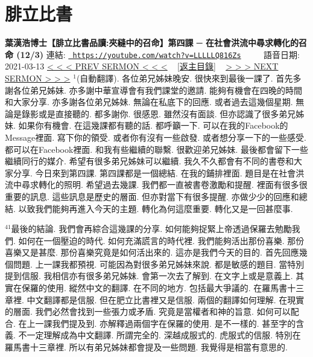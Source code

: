 \documentclass{book}
\begin{document}
\section{腓立比書}
\label{sec:LLLLLQ816Zs}
\textbf{葉漢浩博士【腓立比書品讀:夾縫中的召命】第四課 ─ 在社會洪流中尋求轉化的召命 (12/3)}
\newline
\newline
連結: \href{https://youtube.com/watch?v=LLLLLQ816Zs}{\texttt{ https://youtube.com/watch?v=LLLLLQ816Zs}} ~~~~ 語音日期: 2021-03-13 
\newline
\newline
\hyperref[sec:mVawzgk9_PE]{\small{< < < PREV SERMON < < <}}
~
\hyperref[sec:index]{\small{[返主目錄]}}
~
\hyperref[sec:SEh8cg_SNkc]{\small{> > > NEXT SERMON > > >}}
\newline
\newline
$^{1}$(自動翻譯).
各位弟兄姊妹晚安.
很快來到最後一課了.
首先多謝各位弟兄姊妹.
亦多謝中華宣導會有我們課堂的邀請.
能夠有機會在四晚的時間和大家分享.
亦多謝各位弟兄姊妹.
無論在私底下的回應.
或者過去這幾個星期.
無論是錄影或是直接聽的.
都多謝你.
很感恩.
雖然沒有面談.
但亦認識了很多弟兄姊妹.
如果你有機會.
在這幾課都有聽的話.
都呼籲一下.
可以在我的Facebook的Message裡面.
寫下你的領受.
或者你有沒有一些啟發.
或者想分享一下的一些感受.
都可以在Facebook裡面.
和我有些繼續的聯繫.
很歡迎弟兄姊妹.
最後都會留下一些繼續同行的媒介.
希望有很多弟兄姊妹可以繼續.
我久不久都會有不同的書卷和大家分享.
今日來到第四課.
第四課都是一個總結.
在我的鋪排裡面.
題目是在社會洪流中尋求轉化的照明.
希望過去幾課.
我們都一直被書卷激勵和提醒.
裡面有很多很重要的訊息.
這些訊息是歷史的層面.
但亦對當下有很多提醒.
亦做少少的回應和總結.
以致我們能夠再進入今天的主題.
轉化為何這麼重要.
轉化又是一回甚麼事.

$^{41}$最後的結論.
我們會再綜合這幾課的分享.
如何能夠捉緊上帝透過保羅去勉勵我們.
如何在一個壓迫的時代.
如何充滿謊言的時代裡.
我們能夠活出那份喜樂.
那份喜樂又是甚麼.
那份喜樂究竟是如何活出來的.
這亦是我們今天的目的.
首先回應幾個問題.
上一課我都預視.
可能因為對很多弟兄姊妹來說.
都是敏感的題目.
當特別提到信服.
我相信亦有很多弟兄姊妹.
會第一次去了解到.
在文字上或是意義上.
其實在保羅的使用.
縱然中文的翻譯.
在不同的地方.
包括最大爭議的.
在羅馬書十三章裡.
中文翻譯都是信服.
但在肥立比書裡又是信服.
兩個的翻譯如何理解.
在現實的層面.
我們必然會找到一些張力或矛盾.
究竟是當權者和神的旨意.
如何可以配合.
在上一課我們提及到.
亦解釋過兩個字在保羅的使用.
是不一樣的.
甚至字的含義.
不一定理解成為中文翻譯.
所謂完全的.
深越成服式的.
虎服式的信服.
特別在羅馬書十三章裡.
所以有弟兄姊妹都會提及一些問題.
我覺得是相當有意思的.
\end{document}
